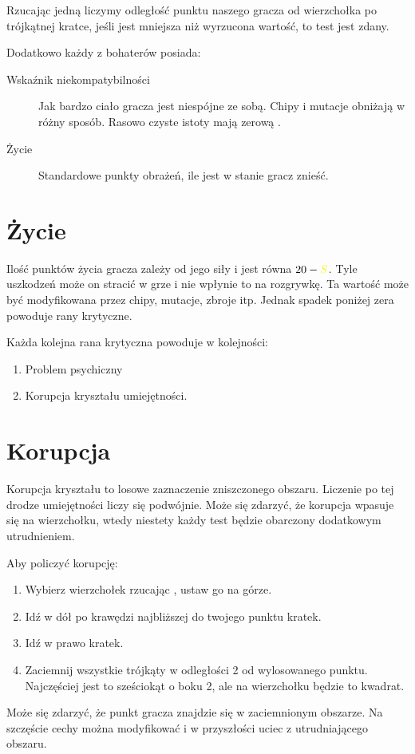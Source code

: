 Rzucając jedną \dxx liczymy odległość punktu naszego gracza od wierzchołka po trójkątnej kratce, jeśli jest mniejsza niż wyrzucona wartość, to test jest zdany.

Dodatkowo każdy z bohaterów posiada:
\begin{description}
 \item [Wskaźnik niekompatybilności \abnkp] Jak bardzo ciało gracza jest niespójne ze sobą. Chipy i mutacje obniżają \abnkp w różny sposób. Rasowo czyste istoty mają zerową \abnkp.
 \item [Życie \abzyc] Standardowe punkty obrażeń, ile jest w stanie gracz znieść.
\end{description}


\section{Życie}
Ilość punktów życia gracza zależy od jego siły i jest równa $20 - \abs$.
Tyle uszkodzeń może on stracić w grze i nie wpłynie to na rozgrywkę.
Ta wartość może być modyfikowana przez chipy, mutacje, zbroje itp.
Jednak spadek poniżej zera powoduje rany krytyczne.

Każda kolejna rana krytyczna powoduje w kolejności:
\begin{enumerate}
\item Problem psychiczny
\item Korupcja kryształu umiejętności.
\end{enumerate}

\section{Korupcja}
Korupcja kryształu to losowe zaznaczenie zniszczonego obszaru.
Liczenie po tej drodze umiejętności liczy się podwójnie.
Może się zdarzyć, że korupcja wpasuje się na wierzchołku, wtedy niestety każdy test będzie obarczony dodatkowym utrudnieniem.

Aby policzyć korupcję:
\begin{enumerate}
 \item Wybierz wierzchołek rzucając \dvi, ustaw go na górze.
 \item Idź w dół po krawędzi najbliższej do twojego punktu \dxx kratek.
 \item Idź w prawo \dxx[2] kratek.
 \item Zaciemnij wszystkie trójkąty w odległości 2 od wylosowanego punktu. Najczęściej jest to sześciokąt o boku 2, ale na wierzchołku będzie to kwadrat.
\end{enumerate}
Może się zdarzyć, że punkt gracza znajdzie się w zaciemnionym obszarze. 
Na szczęście cechy można modyfikować i w przyszłości uciec z utrudniającego obszaru.

